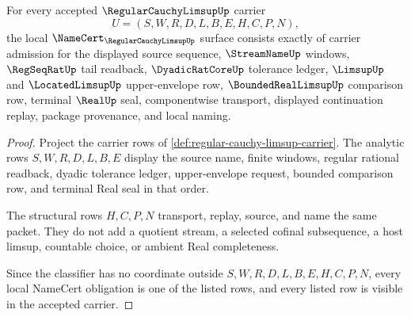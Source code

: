 \begin{theorem}
\label{thm:regular-cauchy-limsup-namecert-obligations}
For every accepted $\RegularCauchyLimsupUp$ carrier
$$
U=(S,W,R,D,L,B,E,H,C,P,N),
$$
the local $\NameCert_{\RegularCauchyLimsupUp}$ surface consists exactly of carrier admission for the displayed source sequence, $\StreamNameUp$ windows, $\RegSeqRatUp$ tail readback, $\DyadicRatCoreUp$ tolerance ledger, $\LimsupUp$ and $\LocatedLimsupUp$ upper-envelope row, $\BoundedRealLimsupUp$ comparison row, terminal $\RealUp$ seal, componentwise transport, displayed continuation replay, package provenance, and local naming.
\end{theorem}
\begin{proof}
Project the carrier rows of \autoref{def:regular-cauchy-limsup-carrier}. The analytic rows $S,W,R,D,L,B,E$ display the source name, finite windows, regular rational readback, dyadic tolerance ledger, upper-envelope request, bounded comparison row, and terminal Real seal in that order.

The structural rows $H,C,P,N$ transport, replay, source, and name the same packet. They do not add a quotient stream, a selected cofinal subsequence, a host limsup, countable choice, or ambient Real completeness.

Since the classifier has no coordinate outside $S,W,R,D,L,B,E,H,C,P,N$, every local NameCert obligation is one of the listed rows, and every listed row is visible in the accepted carrier.
\end{proof}

